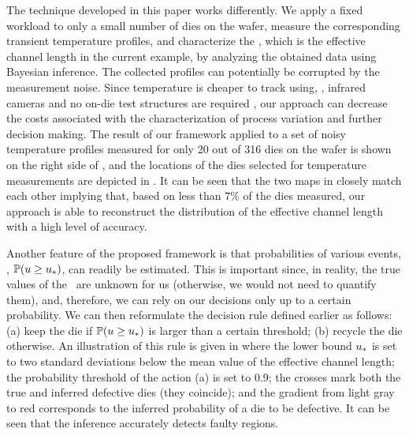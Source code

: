 The technique developed in this paper works differently. We apply a fixed workload to only a small number of dies on the wafer, measure the corresponding transient temperature profiles, and characterize the \qoi, which is the effective channel length in the current example, by analyzing the obtained data using Bayesian inference.
The collected profiles can potentially be corrupted by the measurement noise. Since temperature is cheaper to track using, \eg, infrared cameras and no on-die test structures are required \cite{mesa-martinez2007}, our approach can decrease the costs associated with the characterization of process variation and further decision making.
The result of our framework applied to a set of noisy temperature profiles measured for only 20 out of 316 dies on the wafer is shown on the right side of , and the locations of the dies selected for temperature measurements are depicted in .
It can be seen that the two maps in  closely match each other implying that, based on less than $7\%$ of the dies measured, our approach is able to reconstruct the distribution of the effective channel length with a high level of accuracy.

Another feature of the proposed framework is that probabilities of various events, \eg, $\mathbb{P}(u \geq u_*)$, can readily be estimated.
This is important since, in reality, the true values of the \qoi\ are unknown for us (otherwise, we would not need to quantify them), and, therefore, we can rely on our decisions only up to a certain probability.
We can then reformulate the decision rule defined earlier as follows: (a) keep the die if $\mathbb{P}(u \geq u_*)$ is larger than a certain threshold; (b) recycle the die otherwise.
An illustration of this rule is given in  where the lower bound $u_*$ is set to two standard deviations below the mean value of the effective channel length; the probability threshold of the action (a) is set to 0.9; the crosses mark both the true and inferred defective dies (they coincide); and the gradient from light gray to red corresponds to the inferred probability of a die to be defective. It can be seen that the inference accurately detects faulty regions.


